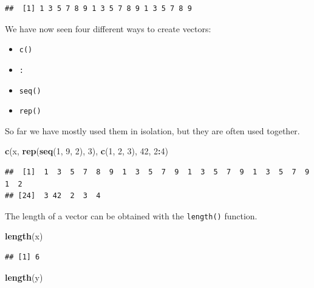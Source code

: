 \documentclass[]{book}
\newenvironment{Shaded}{\begin{snugshade}}{\end{snugshade}}
\newcommand{\KeywordTok}[1]{\textcolor[rgb]{0.13,0.29,0.53}{\textbf{#1}}}
\newcommand{\DecValTok}[1]{\textcolor[rgb]{0.00,0.00,0.81}{#1}}
\newcommand{\OperatorTok}[1]{\textcolor[rgb]{0.81,0.36,0.00}{\textbf{#1}}}
\newcommand{\NormalTok}[1]{#1}
\providecommand{\tightlist}{%
  \setlength{\itemsep}{0pt}\setlength{\parskip}{0pt}}
\theoremstyle{definition}
\theoremstyle{definition}
\theoremstyle{definition}
\theoremstyle{remark}
\begin{document}
\begin{verbatim}
##  [1] 1 3 5 7 8 9 1 3 5 7 8 9 1 3 5 7 8 9
\end{verbatim}

We have now seen four different ways to create vectors:

\begin{itemize}
\tightlist
\item
  \texttt{c()}
\item
  \texttt{:}
\item
  \texttt{seq()}
\item
  \texttt{rep()}
\end{itemize}

So far we have mostly used them in isolation, but they are often used
together.

\begin{Shaded}
\begin{Highlighting}[]
\KeywordTok{c}\NormalTok{(x, }\KeywordTok{rep}\NormalTok{(}\KeywordTok{seq}\NormalTok{(}\DecValTok{1}\NormalTok{, }\DecValTok{9}\NormalTok{, }\DecValTok{2}\NormalTok{), }\DecValTok{3}\NormalTok{), }\KeywordTok{c}\NormalTok{(}\DecValTok{1}\NormalTok{, }\DecValTok{2}\NormalTok{, }\DecValTok{3}\NormalTok{), }\DecValTok{42}\NormalTok{, }\DecValTok{2}\OperatorTok{:}\DecValTok{4}\NormalTok{)}
\end{Highlighting}
\end{Shaded}

\begin{verbatim}
##  [1]  1  3  5  7  8  9  1  3  5  7  9  1  3  5  7  9  1  3  5  7  9  1  2
## [24]  3 42  2  3  4
\end{verbatim}

The length of a vector can be obtained with the \texttt{length()}
function.

\begin{Shaded}
\begin{Highlighting}[]
\KeywordTok{length}\NormalTok{(x)}
\end{Highlighting}
\end{Shaded}

\begin{verbatim}
## [1] 6
\end{verbatim}

\begin{Shaded}
\begin{Highlighting}[]
\KeywordTok{length}\NormalTok{(y)}
\end{Highlighting}
\end{Shaded}
\end{document}
